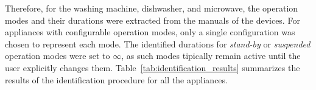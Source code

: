 Therefore, for the washing machine, dishwasher, and microwave, the operation modes and their durations were extracted from the manuals of the devices. For appliances with configurable operation modes, only a single configuration was chosen to represent each mode. The identified durations for \textit{stand-by} or \textit{suspended} operation modes were set to $\infty$, as such modes tipically remain active until the user explicitly changes them. Table~\ref{tab:identification_results} summarizes the results of the identification procedure for all the appliances.

\begin{table}
\centering
{}
\end{table}
